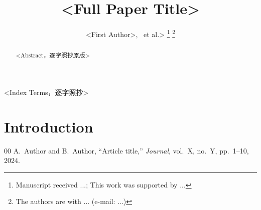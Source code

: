 \documentclass[journal]{IEEEtran}
\begin{document}
\title{<Full Paper Title>}

\author{<First Author>,~ et al.>%
\thanks{Manuscript received ...; This work was supported by ...}%
\thanks{The authors are with ... (e-mail: ...)}%
}


\maketitle

\begin{abstract}
<Abstract，逐字照抄原版>
\end{abstract}

\begin{IEEEkeywords}
<Index Terms，逐字照抄>
\end{IEEEkeywords}

\section{Introduction}
\label{sec:intro}





\begin{thebibliography}{00}
 A.~Author and B.~Author, ``Article title,'' \emph{Journal}, vol.~X, no.~Y, pp.~1--10, 2024.
\end{thebibliography}

\end{document}

